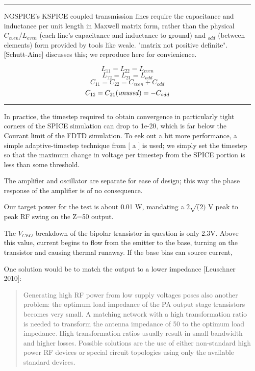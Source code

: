 \documentclass[paper.tex]{subfiles}
\begin{document}
\rule{\linewidth}{0.2pt}

NGSPICE's KSPICE coupled transmission lines require the capacitance and inductance per unit length in Maxwell matrix form, rather than the physical $C_{even}$/$L_{even}$ (each line's capacitance and inductance to ground) and $_{odd}$ (between elements) form provided by tools like wcalc. "matrix not positive definite". [Schutt-Aine] discusses this; we reproduce here for convienience.

\[ L_{11} = L_{22} = L_{even}  \]
\[ L_{12} = L_{21} = L_{odd}  \]
\[ C_{11} = C_{22} = C_{even}+C_{odd}  \]
\[ C_{12} = C_{21} {\it{(unused)}} = -C_{odd}  \]

\rule{\linewidth}{0.2pt}

In practice, the timestep required to obtain convergence in particularly tight corners of the SPICE simulation can drop to 1e-20, which is far below the Courant limit of the FDTD simulation. To eek out a bit more performance, a simple adaptive-timestep technique from [ a ] is used; we simply set the timestep so that the maximum change in voltage per timestep from the SPICE portion is less than some threshold.



The amplifier and oscillator are separate for ease of design; this way the phase response of the amplifier is of no consequence. 

Our target power for the test is about 0.01 W, mandating a $2 \sqrt(2)$ V peak to peak RF swing on the Z=50 output.

The $V_{CEO}$ breakdown of the bipolar transistor in question is only 2.3V. Above this value, current begins to flow from the emitter to the base, turning on the transistor and causing thermal runaway. If the base bias can source current, 

One solution would be to match the output to a lower impedance [Leuschner 2010]:

\begin{quote}
Generating high RF power from low supply voltages poses also another problem: the optimum load impedance of the PA output stage transistors becomes very small. A matching network with a high transformation ratio is needed to transform the antenna impedance of 50 to the optimum load impedance. High transformation ratios usually result in small bandwidth and higher losses. Possible solutions are the use of either non-standard high power RF devices or special circuit topologies using only the available standard devices.
\end{quote}
\end{document}

